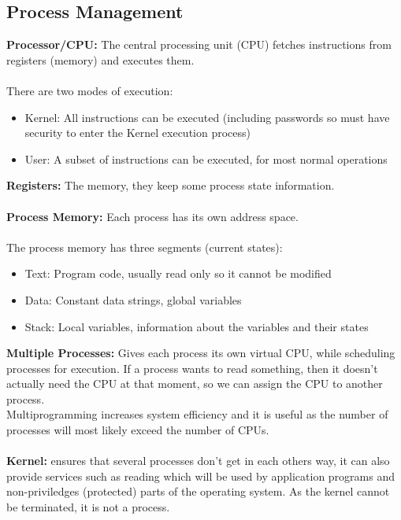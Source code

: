 \documentclass[a4paper,10pt]{article}
\begin{document}
\subsection{Process Management}
\textcolor{WildStrawberry}{\textbf{Processor/CPU:}} The central processing unit (CPU) fetches instructions from registers (memory) and executes them. \\\\
There are two modes of execution: 
\renewcommand{\labelitemi}{\textperiodcentered}
\begin{itemize}
\item \textcolor{WildStrawberry}{Kernel:} All instructions can be executed (including passwords so must have security to enter the Kernel execution process)
\item \textcolor{WildStrawberry}{User:} A subset of instructions can be executed, for most normal operations
\end{itemize}
\textcolor{WildStrawberry}{\textbf{Registers:}} The memory, they keep some process state information. \\\\
\textcolor{WildStrawberry}{\textbf{Process Memory:}} Each process has its own address space. \\\\
The process memory has three segments (current states): 
\begin{itemize}
\item \textcolor{WildStrawberry}{Text:} Program code, usually read only so it cannot be modified 
\item \textcolor{WildStrawberry}{Data:} Constant data strings, global variables 
\item \textcolor{WildStrawberry}{Stack:} Local variables, information about the variables and their states \\
\end{itemize}
\textcolor{WildStrawberry}{\textbf{Multiple Processes:}} Gives each process its own virtual CPU, while scheduling processes for execution. If a process wants to read something, then it doesn't actually need the CPU at that moment, so we can assign the CPU to another process. \\
Multiprogramming increases system efficiency and it is useful as the number of processes will most likely exceed the number of CPUs. \\\\
\textcolor{WildStrawberry}{\textbf{Kernel:}} ensures that several processes don't get in each others way, it can also provide services such as reading which will be used by application programs and non-priviledges (protected) parts of the operating system. As the kernel cannot be terminated, it is not a process. \\\\
\end{document}
